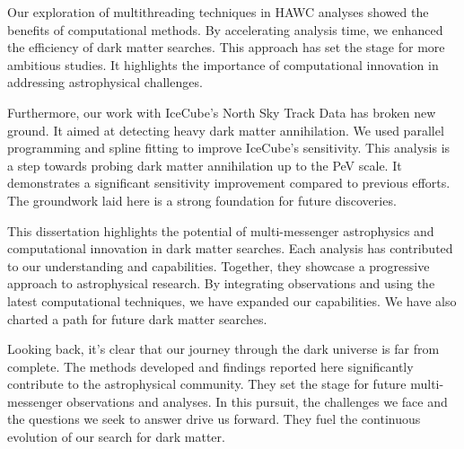 Our exploration of multithreading techniques in HAWC analyses showed the benefits of computational methods. By accelerating analysis time, we enhanced the efficiency of dark matter searches. This approach has set the stage for more ambitious studies. It highlights the importance of computational innovation in addressing astrophysical challenges.

Furthermore, our work with IceCube's North Sky Track Data has broken new ground. It aimed at detecting heavy dark matter annihilation. We used parallel programming and spline fitting to improve IceCube's sensitivity. This analysis is a step towards probing dark matter annihilation up to the PeV scale. It demonstrates a significant sensitivity improvement compared to previous efforts. The groundwork laid here is a strong foundation for future discoveries.

This dissertation highlights the potential of multi-messenger astrophysics and computational innovation in dark matter searches. Each analysis has contributed to our understanding and capabilities. Together, they showcase a progressive approach to astrophysical research. By integrating observations and using the latest computational techniques, we have expanded our capabilities. We have also charted a path for future dark matter searches.

Looking back, it's clear that our journey through the dark universe is far from complete. The methods developed and findings reported here significantly contribute to the astrophysical community. They set the stage for future multi-messenger observations and analyses. In this pursuit, the challenges we face and the questions we seek to answer drive us forward. They fuel the continuous evolution of our search for dark matter.

